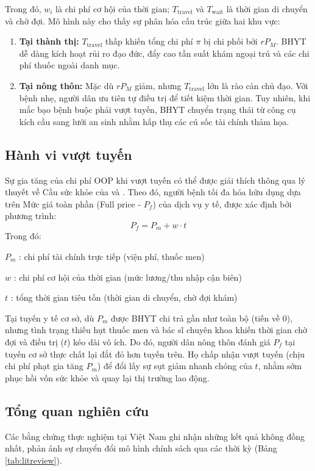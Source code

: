 \documentclass[12pt,a4paper]{article}
\begin{document}
Trong đó, $w_i$ là chi phí cơ hội của thời gian; $T_{\text{travel}}$ và $T_{\text{wait}}$ là thời gian di chuyển và chờ đợi. Mô hình này cho thấy sự phân hóa cấu trúc giữa hai khu vực:
\begin{enumerate}
	\item \textbf{Tại thành thị:} $T_{\text{travel}}$ thấp khiến tổng chi phí $\pi$ bị chi phối bởi $rP_M$. BHYT dễ dàng kích hoạt rủi ro đạo đức, đẩy cao tần suất khám ngoại trú và các chi phí thuốc ngoài danh mục.
	\item \textbf{Tại nông thôn:} Mặc dù $rP_M$ giảm, nhưng $T_{\text{travel}}$ lớn là rào cản chủ đạo. Với bệnh nhẹ, người dân ưu tiên tự điều trị để tiết kiệm thời gian. Tuy nhiên, khi mắc bạo bệnh buộc phải vượt tuyến, BHYT chuyển trạng thái từ công cụ kích cầu sang lưới an sinh nhằm hấp thụ các cú sốc tài chính thảm họa.
\end{enumerate}

\subsection{Hành vi vượt tuyến}

Sự gia tăng của chi phí OOP khi vượt tuyến có thể được giải thích thông qua lý thuyết về Cầu sức khỏe của \textcite{grossman1972} và \textcite{sarkodie2022}. Theo đó, người bệnh tối đa hóa hữu dụng dựa trên Mức giá toàn phần (Full price - $P_f$) của dịch vụ y tế, được xác định bởi phương trình:
\begin{equation}
	P_f = P_m + w \cdot t
\end{equation}
Trong đó:

$P_m$ : chi phí tài chính trực tiếp (viện phí, thuốc men) 

$w$ : chi phí cơ hội của thời gian (mức lương/thu nhập cận biên)

$t$ : tổng thời gian tiêu tốn (thời gian di chuyển, chờ đợi khám)

Tại tuyến y tế cơ sở, dù $P_m$ được BHYT chi trả gần như toàn bộ (tiến về 0), nhưng tình trạng thiếu hụt thuốc men và bác sĩ chuyên khoa khiến thời gian chờ đợi và điều trị ($t$) kéo dài vô ích. Do đó, người dân nông thôn đánh giá $P_f$ tại tuyến cơ sở thực chất lại đắt đỏ hơn tuyến trên. Họ chấp nhận vượt tuyến (chịu chi phí phạt gia tăng $P_m$) để đổi lấy sự sụt giảm nhanh chóng của $t$, nhằm sớm phục hồi vốn sức khỏe và quay lại thị trường lao động.

\clearpage
\subsection{Tổng quan nghiên cứu}
Các bằng chứng thực nghiệm tại Việt Nam ghi nhận những kết quả không đồng nhất, phản ánh sự chuyển đổi mô hình chính sách qua các thời kỳ (Bảng \ref{tab:litreview}).
\end{document}
